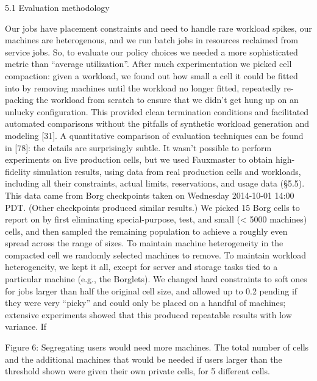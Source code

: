 5.1 Evaluation methodology

Our jobs have placement constraints and need to handle rare
workload spikes, our machines are heterogenous, and we
run batch jobs in resources reclaimed from service jobs. So,
to evaluate our policy choices we needed a more sophisticated metric than “average utilization”. After much experimentation we picked cell compaction: given a workload,
we found out how small a cell it could be fitted into by
removing machines until the workload no longer fitted, repeatedly re-packing the workload from scratch to ensure that
we didn’t get hung up on an unlucky configuration. This
provided clean termination conditions and facilitated automated comparisons without the pitfalls of synthetic workload generation and modeling [31]. A quantitative comparison of evaluation techniques can be found in [78]: the details
are surprisingly subtle.
It wasn’t possible to perform experiments on live production cells, but we used Fauxmaster to obtain high-fidelity
simulation results, using data from real production cells
and workloads, including all their constraints, actual limits, reservations, and usage data (§5.5). This data came
from Borg checkpoints taken on Wednesday 2014-10-01
14:00 PDT. (Other checkpoints produced similar results.)
We picked 15 Borg cells to report on by first eliminating
special-purpose, test, and small (< 5000 machines) cells,
and then sampled the remaining population to achieve a
roughly even spread across the range of sizes.
To maintain machine heterogeneity in the compacted cell
we randomly selected machines to remove. To maintain
workload heterogeneity, we kept it all, except for server and
storage tasks tied to a particular machine (e.g., the Borglets).
We changed hard constraints to soft ones for jobs larger than
half the original cell size, and allowed up to 0.2%
pending if they were very “picky” and could only be placed
on a handful of machines; extensive experiments showed
that this produced repeatable results with low variance. If

Figure 6: Segregating users would need more machines. The total
number of cells and the additional machines that would be needed
if users larger than the threshold shown were given their own
private cells, for 5 different cells.

